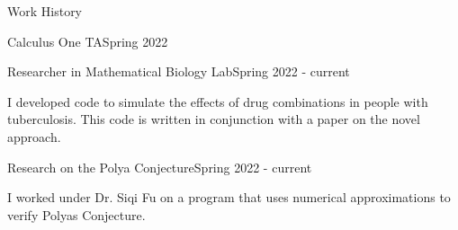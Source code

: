 \documentclass{resume} %
\begin{document}
\begin{rSection}{Work History}
\begin{rSubsection}{Calculus One TA}{}{Spring 2022}{}
\end{rSubsection}


\begin{rSubsection}{Researcher in Mathematical Biology Lab}{}{Spring 2022 - current}{}
\item I developed code to simulate the effects of drug combinations in people with tuberculosis.
This code is written in conjunction with a paper on the novel approach.

\end{rSubsection}


\begin{rSubsection}{Research on the Polya Conjecture}{}{Spring 2022 - current}{}
\item I worked under Dr. Siqi Fu on a program that uses numerical approximations to verify Polyas Conjecture.

\end{rSubsection}

\end{rSection} 

\end{document}
